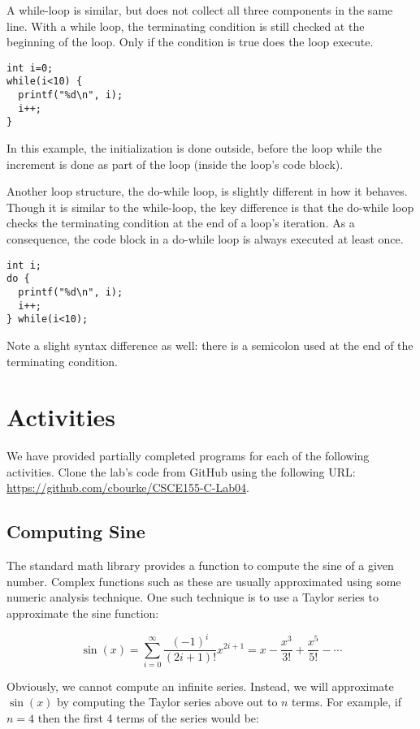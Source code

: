\documentclass[12pt]{scrartcl}
\begin{document}
A while-loop is similar, but does not collect all three components 
in the same line.  With a while loop, the terminating condition is 
still checked at the beginning of the loop.  Only if the condition is 
true does the loop execute.  

\begin{verbatim}
int i=0;
while(i<10) {
  printf("%d\n", i);
  i++;
}
\end{verbatim}

In this example, the initialization is done outside, before the loop 
while the increment is done as part of the loop (inside the loop's 
code block).  

Another loop structure, the do-while loop, is slightly different in 
how it behaves.  Though it is similar to the while-loop, the key 
difference is that the do-while loop checks the terminating condition 
at the end of a loop's iteration.  As a consequence, the code block 
in a do-while loop is always executed at least once.

\begin{verbatim}
int i;
do {
  printf("%d\n", i);
  i++;
} while(i<10);
\end{verbatim}

Note a slight syntax difference as well: there is a semicolon used 
at the end of the terminating condition. 

\section{Activities}

We have provided partially completed programs for each of the 
following activities.  Clone the lab's code from GitHub using the 
following URL: \url{https://github.com/cbourke/CSCE155-C-Lab04}.

\subsection{Computing Sine}

The standard math library provides a function to compute the sine 
of a given number.  Complex functions such as these are usually 
approximated using some numeric analysis technique.  One such 
technique is to use a Taylor series to approximate the sine function:

$$\sin{(x)} = \sum_{i=0}^\infty \frac{(-1)^i}{(2i+1)!} x^{2i+1} = x - \frac{x^3}{3!}+\frac{x^5}{5!}-\cdots$$

Obviously, we cannot compute an infinite series.  Instead, we will 
approximate $\sin(x)$ by computing the Taylor series above out to $n$ 
terms.  For example, if $n = 4$ then the first 4 terms of the series would be:
\end{document}
